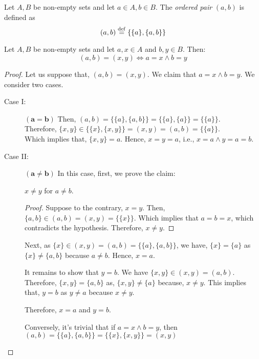 \documentclass[11pt]{scrartcl}
\begin{document}
    \begin{definition}
        Let \(A, B\) be non-empty sets and let \(a \in A, b \in B\). The \emph{ordered pair} \((a,b)\) is defined as \[(a, b) \overset{\mathrm{def}}{=} \{\{a\}, \{a, b\}\}\]
    \end{definition}
    \begin{lemma}
        Let \(A, B\) be non-empty sets and let \(a, x \in A\) and \(b, y \in B\). Then: \[(a, b) = (x, y) \iff a = x \wedge b = y\] 
    \end{lemma}
    \begin{proof}
        Let us suppose that, \((a, b) = (x, y)\). We claim that \(a = x \wedge b = y\). We consider two cases.

        \begin{description}
            \item[Case I:] \(\mathbf{(a = b)}\) Then, \((a, b) = \{\{a\}, \{a, b\}\} = \{\{a\}, \{a\}\} = \{\{a\}\}\). \\ Therefore, \(\{x, y\} \in \{\{x\}, \{x, y\}\} = (x, y) = (a, b) = \{\{a\}\}\). \\ Which implies that, \(\{x, y\} = {a}\). Hence, \(x = y = a\), i.e., \(x = a \wedge y = a = b\).
            \item[Case II:] \(\mathbf{(a \neq b)}\) In this case, first, we prove the claim:
            \begin{claim}
                \(x \neq y\) for \(a \neq b\).
            \end{claim}
            \begin{proof}
                Suppose to the contrary, \(x = y\). Then, \(\{a, b\} \in (a, b) = (x, y) = \{\{x\}\}\). Which implies that \(a = b = x\), which contradicts the hypothesis. Therefore, \(x \neq y\).
            \end{proof}
            Next, as \(\{x\} \in (x, y) = (a, b) = \{\{a\}, \{a, b\}\}\), we have, \(\{x\} = \{a\}\) as \(\{x\} \neq \{a, b\}\) because \(a \neq b\). Hence, \(x = a\).

            It remains to show that \(y = b\). We have \(\{x, y\} \in (x, y) = (a, b)\). Therefore, \(\{x, y\} = \{a, b\}\) as, \(\{x, y\} \neq \{a\}\) because, \(x \neq y\). This implies that, \(y = b\) as \(y \neq a\) because \(x \neq y\).

            Therefore, \(x = a\) and \(y = b\).

            Conversely, it's trivial that if \(a = x \wedge b = y\), then \((a, b) = \{\{a\}, \{a, b\}\} = \{\{x\}, \{x, y\}\} = (x, y)\)
        \end{description}
    \end{proof}
\end{document}
